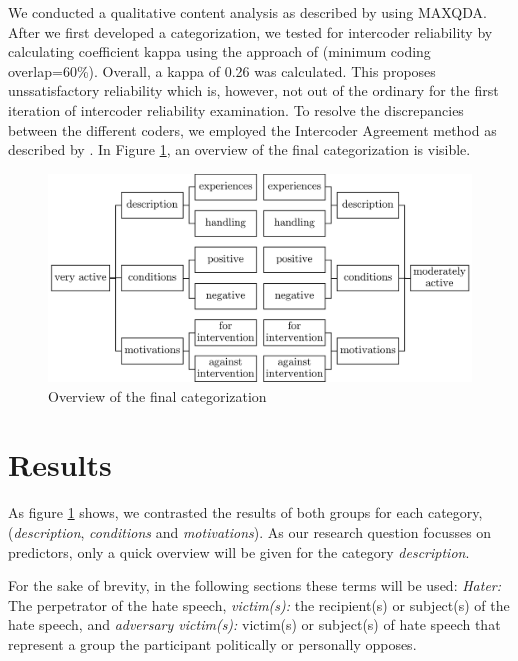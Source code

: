\documentclass[runningheads]{llncs}
\begin{document}
We conducted a qualitative content analysis as described by \textcite{mayringQualitativeContentAnalysis2014} using MAXQDA.
After we first developed a categorization, we tested for intercoder reliability by calculating coefficient kappa using the approach of \textcite{brennan1981coefficient} (minimum coding overlap=60\%).
Overall, a kappa of 0.26 was calculated. This proposes unssatisfactory reliability which is, however, not out of the ordinary for the first iteration of intercoder reliability examination. \autocite{campbellCodingIndepthSemistructured2013,macphailProcessGuidelinesEstablishing2016} To resolve the discrepancies between the different coders, we employed the Intercoder Agreement method as described by \textcite{campbellCodingIndepthSemistructured2013}.
In Figure \ref{fig:categorization}, an overview of the final categorization is visible.

\begin{figure}
\includegraphics[width=1\linewidth]{../images/categorization} \caption{Overview of the final categorization}\label{fig:categorization}
\end{figure}

\hypertarget{results}{%
\section{Results}\label{results}}

As figure \ref{fig:categorization} shows, we contrasted the results of both groups for each category, (\emph{description}, \emph{conditions} and \emph{motivations}). As our research question focusses on predictors, only a quick overview will be given for the category \emph{description}.

For the sake of brevity, in the following sections these terms will be used:
\emph{Hater:} The perpetrator of the hate speech,
\emph{victim(s):} the recipient(s) or subject(s) of the hate speech, and
\emph{adversary victim(s):} victim(s) or subject(s) of hate speech that represent a group the participant politically or personally opposes.
\end{document}
